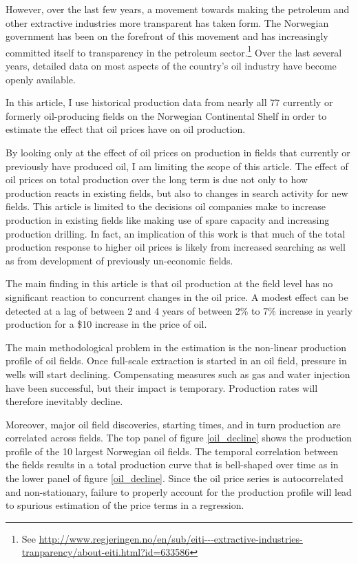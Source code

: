 \documentclass[12pt]{article}
\begin{document}
However, over the last few years, a movement towards making the petroleum and other extractive industries more transparent has taken form.  The Norwegian government has been on the forefront of this movement and has increasingly committed itself to transparency in the petroleum sector.\footnote{See \url{http://www.regjeringen.no/en/sub/eiti---extractive-industries-tranparency/about-eiti.html?id=633586}} Over the last several years, detailed data on most aspects of the country's oil industry have become openly available.  

In this article, I use historical production data from nearly all 77 currently or formerly oil-producing fields on the Norwegian Continental Shelf in order to estimate the effect that oil prices have on oil production.

By looking only at the effect of oil prices on production in fields that currently or previously have produced oil, I am limiting the scope of this article.  The effect of oil prices on total production over the long term is due not only to how production reacts in existing fields, but also to changes in search activity for new fields. This article is limited to the decisions oil companies make to increase production in existing fields like making use of spare capacity and increasing production drilling. In fact, an implication of this work is that much of the total production response to higher oil prices is likely from increased searching as well as from development of previously un-economic fields.

The main finding in this article is that oil production at the field level has no significant reaction to concurrent changes in the oil price.  A modest effect can be detected at a lag of between 2 and 4 years of between 2\% to 7\% increase in yearly production for a \$10 increase in the price of oil.


The main methodological problem in the estimation is the non-linear production profile of oil fields. Once full-scale extraction is started in an oil field, pressure in wells will start declining. Compensating measures such as gas and water injection have been successful, but their impact is temporary. Production rates will therefore inevitably decline.

Moreover, major oil field discoveries, starting times, and in turn production are correlated across fields. The top panel of figure \ref{oil_decline} shows the production profile of the 10 largest Norwegian oil fields. The temporal correlation between the fields results in a total production curve that is bell-shaped over time as in the lower panel of figure \ref{oil_decline}.  Since the oil price series is autocorrelated and non-stationary, failure to properly account for the production profile will lead to spurious estimation of the price terms in a regression.
\end{document}
